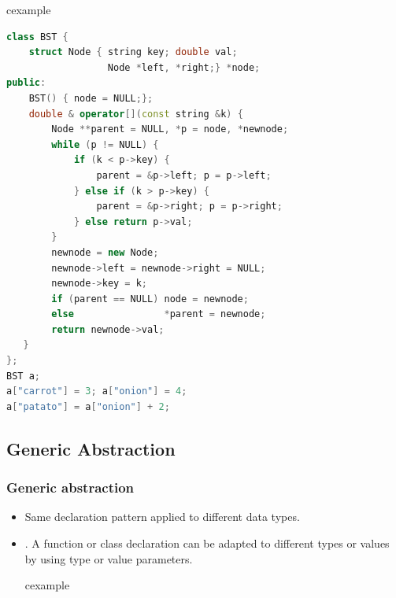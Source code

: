 \begin{frame}[fragile]
\begin{beamercolorbox}{cexample}
\begin{lstlisting}[language=C++]
class BST {
    struct Node { string key; double val; 
                  Node *left, *right;} *node;
public:
    BST() { node = NULL;};
    double & operator[](const string &k) {
        Node **parent = NULL, *p = node, *newnode;
        while (p != NULL) {
            if (k < p->key) {
                parent = &p->left; p = p->left;
            } else if (k > p->key) {
                parent = &p->right; p = p->right;
            } else return p->val;
        }
        newnode = new Node;
        newnode->left = newnode->right = NULL;
        newnode->key = k; 
        if (parent == NULL) node = newnode;
        else                *parent = newnode;
        return newnode->val;
   }
};
BST a;
a["carrot"] = 3; a["onion"] = 4;
a["patato"] = a["onion"] + 2;
\end{lstlisting}
\end{beamercolorbox}
\end{frame}

\subsection{Generic Abstraction}
\begin{frame}
\frametitle{Generic abstraction}
\begin{itemize}
 \item Same declaration pattern applied to different data types.
 \item {}. A function or class declaration can be adapted
 to different types or values by using type or value parameters.
\begin{beamercolorbox}{cexample}
 \codetemplateCpp
\end{beamercolorbox}
\end{itemize}
\end{frame}


